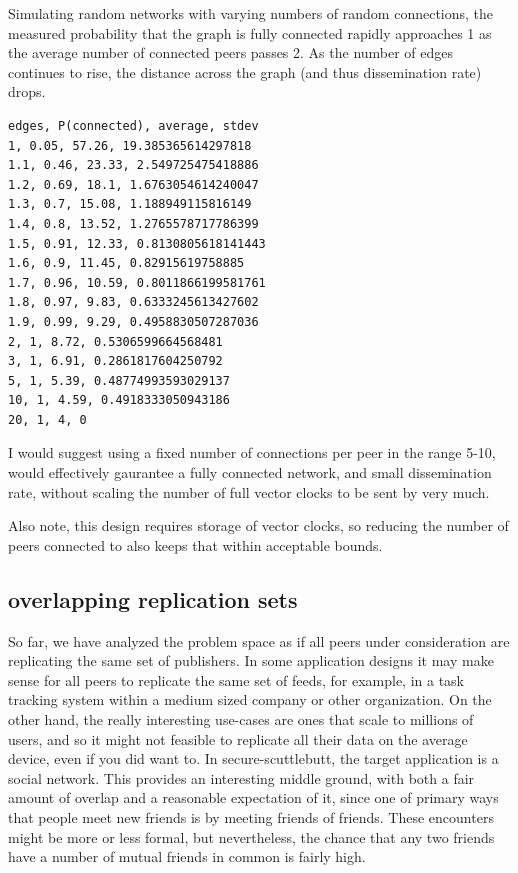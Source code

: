 \documentclass[sigconf]{acmart}
\begin{document}
Simulating random networks with varying numbers of random connections,
the measured probability that the graph is fully connected rapidly
approaches 1 as the average number of connected peers passes 2. As the
number of edges continues to rise, the distance across the graph (and
thus dissemination rate) drops.

\begin{verbatim}
edges, P(connected), average, stdev
1, 0.05, 57.26, 19.385365614297818
1.1, 0.46, 23.33, 2.549725475418886
1.2, 0.69, 18.1, 1.6763054614240047
1.3, 0.7, 15.08, 1.188949115816149
1.4, 0.8, 13.52, 1.2765578717786399
1.5, 0.91, 12.33, 0.8130805618141443
1.6, 0.9, 11.45, 0.82915619758885
1.7, 0.96, 10.59, 0.8011866199581761
1.8, 0.97, 9.83, 0.6333245613427602
1.9, 0.99, 9.29, 0.4958830507287036
2, 1, 8.72, 0.5306599664568481
3, 1, 6.91, 0.2861817604250792
5, 1, 5.39, 0.48774993593029137
10, 1, 4.59, 0.4918333050943186
20, 1, 4, 0
\end{verbatim}

I would suggest using a fixed number of connections per peer in the
range 5-10, would effectively gaurantee a fully connected network, and
small dissemination rate, without scaling the number of full vector
clocks to be sent by very much.

Also note, this design requires storage of vector clocks, so reducing
the number of peers connected to also keeps that within acceptable
bounds.

\subsection{overlapping replication sets}

So far, we have analyzed the problem space as if all peers under
consideration are replicating the same set of publishers. In some
application designs it may make sense for all peers to replicate the
same set of feeds, for example, in a task tracking system within a
medium sized company or other organization.  On the other hand, the
really interesting use-cases are ones that scale to millions of users,
and so it might not feasible to replicate all their data on the
average device, even if you did want to. In secure-scuttlebutt, the
target application is a social network.  This provides an interesting
middle ground, with both a fair amount of overlap and a reasonable
expectation of it, since one of primary ways that people meet new
friends is by meeting friends of friends. These encounters might be
more or less formal, but nevertheless, the chance that any two friends
have a number of mutual friends in common is fairly high.
\end{document}
